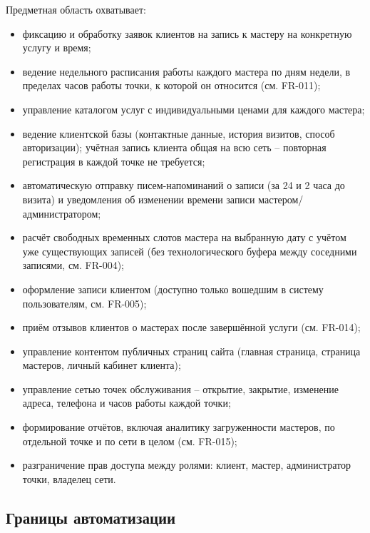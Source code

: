 Предметная область охватывает:
\begin{itemize}
  \item фиксацию и обработку заявок клиентов на запись к мастеру на конкретную услугу и время;
  \item ведение недельного расписания работы каждого мастера по дням недели, в пределах часов работы точки, к которой он относится (см. FR-011);
  \item управление каталогом услуг с индивидуальными ценами для каждого мастера;
  \item ведение клиентской базы (контактные данные, история визитов, способ авторизации); учётная запись клиента общая на всю сеть -- повторная регистрация в каждой точке не требуется;
  \item автоматическую отправку писем-напоминаний о записи (за 24 и 2 часа до визита) и уведомления об изменении времени записи мастером/администратором;
  \item расчёт свободных временных слотов мастера на выбранную дату с учётом уже существующих записей (без технологического буфера между соседними записями, см. FR-004);
  \item оформление записи клиентом (доступно только вошедшим в систему пользователям, см. FR-005);
  \item приём отзывов клиентов о мастерах после завершённой услуги (см. FR-014);
  \item управление контентом публичных страниц сайта (главная страница, страница мастеров, личный кабинет клиента);
  \item управление сетью точек обслуживания -- открытие, закрытие, изменение адреса, телефона и часов работы каждой точки;
  \item формирование отчётов, включая аналитику загруженности мастеров, по отдельной точке и по сети в целом (см. FR-015);
  \item разграничение прав доступа между ролями: клиент, мастер, администратор точки, владелец сети.
\end{itemize}

\subsection{Границы автоматизации}

